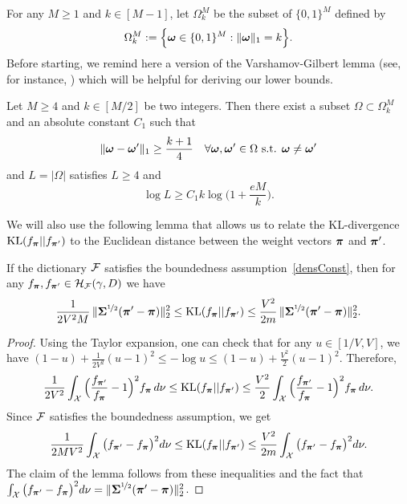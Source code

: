 For any $M\geq 1$ and $k\in [M-1]$, let  $\Omega_k^M$ be the subset of $\{0,1\}^M$ defined by
\begin{equation}
\Omega_k^M := \Big \{\boldsymbol \omega \in \{0,1\}^M : \|\boldsymbol \omega\|_1=k \Big\}.
\end{equation}
Before starting, we remind here a version of the Varshamov-Gilbert lemma (see, for instance, \citep[Lemma 8.3]{RT11})
which will be helpful for deriving our lower bounds.
\begin{lemma}
	\label{rigollet8.3}
	Let $M\geq 4$ and $k\in[M/2]$ be two integers. Then there exist a subset $\Omega \subset \Omega_k^M$ and an absolute constant $C_1$
	such that
	\begin{equation}
	\|\boldsymbol \omega-\boldsymbol \omega'\|_1 \geq \frac{k+1}{4} \quad \forall \boldsymbol \omega,\boldsymbol \omega' \in \Omega \text{ \rm s.t. } \boldsymbol \omega \neq \boldsymbol \omega'
	\end{equation}
	and $L=|\Omega|$ satisfies $L\ge 4$ and
	\begin{equation}
	\log L  \geq C_1 k\log\Big(1+\frac{eM}{ k}\Big).
	\end{equation}
\end{lemma}
We will also use the following lemma that allows us to relate the KL-divergence ${\rm KL}(f_{\boldsymbol \pi}||f_{\boldsymbol \pi'})$ 
to the Euclidean distance between the weight vectors $\boldsymbol \pi$ and $\boldsymbol \pi'$. 
\begin{lemma}
	\label{lemma:KLboundsLT}
	If the dictionary $\mathcal F$ satisfies the boundedness assumption~\eqref{densConst}, then for any
	$f_{\boldsymbol \pi}, f_{\boldsymbol \pi'}\in \mathcal H_\mathcal F(\gamma,D)$ we have
	\begin{equation}
	\frac{1}{2V^2M}\,\|\boldsymbol\Sigma^{\nicefrac12}(\boldsymbol \pi'-\boldsymbol \pi)\|_2^2
	\leq {\rm KL}(f_{\boldsymbol \pi}||f_{\boldsymbol \pi'})
	\leq \frac{V^2}{2m}\,\|\boldsymbol\Sigma^{\nicefrac12}(\boldsymbol \pi'-\boldsymbol \pi)\|_2^2.
	\end{equation}
\end{lemma}
\begin{proof}
	Using the Taylor expansion, one can check that for any $u\in[1/V,V]$, we
	have $(1-u)+ \frac{1}{2V^2}(u-1)^2 \leq -\log u \leq (1-u)+\frac{V^2}{2}(u-1)^2$.
	Therefore,
	\begin{equation}
	\frac{1}{2V^2}\int_{\mathcal X}\Big(\frac{f_{\boldsymbol \pi'}}{f_{\boldsymbol \pi}}-1\Big)^2f_{\boldsymbol \pi}\,d\nu
	\leq {\rm KL}(f_{\boldsymbol \pi}||f_{\boldsymbol \pi'}) \leq \frac{V^2}{2}\int_{\mathcal X}\Big(\frac{f_{\boldsymbol \pi'}}{f_{\boldsymbol \pi}}-1\Big)^2
	f_{\boldsymbol \pi}\,d\nu.
	\end{equation}
	Since $\mathcal F$ satisfies the boundedness assumption, we get
	\begin{equation}
	\label{KLboundsLT}
	\frac{1}{2MV^2}\int_{\mathcal X}\big(f_{\boldsymbol \pi'}-f_{\boldsymbol \pi}\big)^2d\nu
	\leq {\rm KL}(f_{\boldsymbol \pi}||f_{\boldsymbol \pi'}) \leq \frac{V^2}{2m}\int_{\mathcal X}\big(f_{\boldsymbol \pi'}-f_{\boldsymbol \pi}\big)^2d\nu.
	\end{equation}
	The claim of the lemma follows from these inequalities and the fact that
	$\int_{\mathcal X}\big(f_{\boldsymbol \pi'}-f_{\boldsymbol \pi}\big)^2d\nu = \|\boldsymbol\Sigma^{\nicefrac12}(\boldsymbol \pi'-\boldsymbol \pi)\|_2^2$.
\end{proof}



